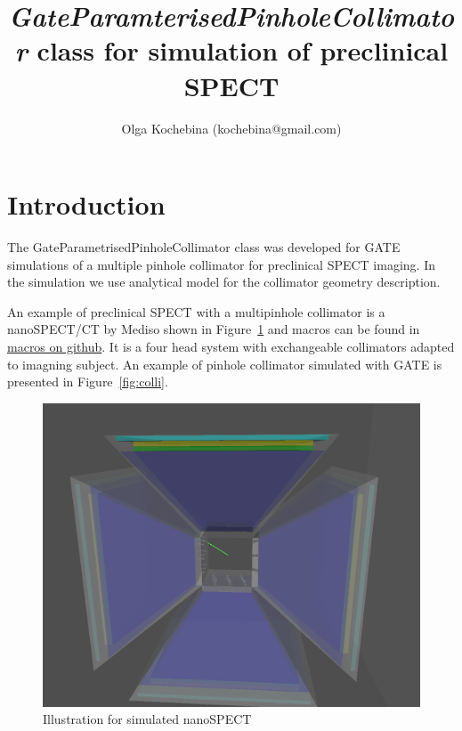 \documentclass[12pt]{article}
\begin{document}
\title{\textit{GateParamterisedPinholeCollimator} class for simulation of preclinical SPECT}
\author{Olga Kochebina (kochebina@gmail.com)}
\maketitle
\tableofcontents
\newpage



\pagebreak


\section{Introduction}
The GateParametrisedPinholeCollimator class was developed for GATE simulations of a multiple pinhole collimator for preclinical SPECT imaging.
In the simulation we use analytical model for the collimator geometry description.

An example of preclinical SPECT with a multipinhole collimator is a nanoSPECT/CT by Mediso shown in Figure~\ref{fig:scanner} and macros can be found in \href{https://github.com/kochebina/ParametrisedPinholeCollimator/tree/main/macros}{macros on github}. It is a four head system with exchangeable collimators adapted to imagning subject. An example of pinhole collimator simulated with GATE is presented in Figure~\ref{fig:colli}.
 
\begin{figure}[htp]
\centering
\includegraphics[scale=0.3]{figs/scanner.png}
\caption{Illustration for simulated nanoSPECT}
\label{fig:scanner}
\end{figure}
\end{document}
